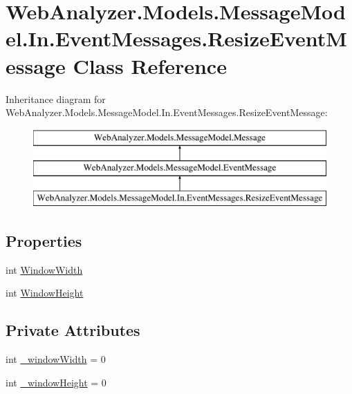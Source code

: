 \hypertarget{class_web_analyzer_1_1_models_1_1_message_model_1_1_in_1_1_event_messages_1_1_resize_event_message}{}\section{Web\+Analyzer.\+Models.\+Message\+Model.\+In.\+Event\+Messages.\+Resize\+Event\+Message Class Reference}
\label{class_web_analyzer_1_1_models_1_1_message_model_1_1_in_1_1_event_messages_1_1_resize_event_message}
Inheritance diagram for Web\+Analyzer.\+Models.\+Message\+Model.\+In.\+Event\+Messages.\+Resize\+Event\+Message\+:\begin{figure}[H]
\begin{center}
\leavevmode
\includegraphics[height=3.000000cm]{class_web_analyzer_1_1_models_1_1_message_model_1_1_in_1_1_event_messages_1_1_resize_event_message}
\end{center}
\end{figure}
\subsection*{Properties}
\begin{DoxyCompactItemize}
\item 
int \hyperlink{class_web_analyzer_1_1_models_1_1_message_model_1_1_in_1_1_event_messages_1_1_resize_event_message_a71924d047ccc6fbc74445e8a4b291e85}{Window\+Width}
\item 
int \hyperlink{class_web_analyzer_1_1_models_1_1_message_model_1_1_in_1_1_event_messages_1_1_resize_event_message_a24184b701063ace4ecf8f00d2e68056f}{Window\+Height}
\end{DoxyCompactItemize}
\subsection*{Private Attributes}
\begin{DoxyCompactItemize}
\item 
int \hyperlink{class_web_analyzer_1_1_models_1_1_message_model_1_1_in_1_1_event_messages_1_1_resize_event_message_a79fea760964664fd139e1f85302b2857}{\+\_\+window\+Width} = 0
\item 
int \hyperlink{class_web_analyzer_1_1_models_1_1_message_model_1_1_in_1_1_event_messages_1_1_resize_event_message_a58970338091e26fc0321e00d6b72528e}{\+\_\+window\+Height} = 0
\end{DoxyCompactItemize}
